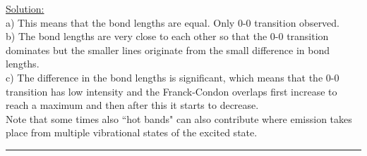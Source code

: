 \noindent
\underline{Solution:}\\

\noindent
a) This means that the bond lengths are equal. Only 0-0 transition observed.\\
b) The bond lengths are very close to each other so that the 0-0 transition dominates but the smaller lines originate from the
small difference in bond lengths.\\
c) The difference in the bond lengths is significant, which means that the 0-0 transition has low intensity and the Franck-Condon
overlaps first increase to reach a maximum and then after this it starts to decrease.\\
Note that some times also ``hot bands" can also contribute where emission takes place from multiple vibrational states of the
excited state.

\hrule\vspace{0.5cm}



